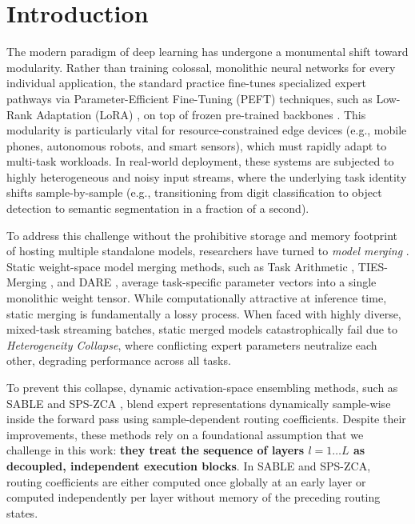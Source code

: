 \section{Introduction}
\label{sec:intro}

The modern paradigm of deep learning has undergone a monumental shift toward modularity. Rather than training colossal, monolithic neural networks for every individual application, the standard practice fine-tunes specialized expert pathways via Parameter-Efficient Fine-Tuning (PEFT) techniques, such as Low-Rank Adaptation (LoRA) \cite{hu21lora}, on top of frozen pre-trained backbones \cite{dosovitskiy20vit, devlin18bert}. This modularity is particularly vital for resource-constrained edge devices (e.g., mobile phones, autonomous robots, and smart sensors), which must rapidly adapt to multi-task workloads. In real-world deployment, these systems are subjected to highly heterogeneous and noisy input streams, where the underlying task identity shifts sample-by-sample (e.g., transitioning from digit classification to object detection to semantic segmentation in a fraction of a second).

To address this challenge without the prohibitive storage and memory footprint of hosting multiple standalone models, researchers have turned to \emph{model merging} \cite{wortsman22soups}. Static weight-space model merging methods, such as Task Arithmetic \cite{ilharco22taskarithmetic}, TIES-Merging \cite{yadav23ties}, and DARE \cite{yu23dare}, average task-specific parameter vectors into a single monolithic weight tensor. While computationally attractive at inference time, static merging is fundamentally a lossy process. When faced with highly diverse, mixed-task streaming batches, static merged models catastrophically fail due to \emph{Heterogeneity Collapse}, where conflicting expert parameters neutralize each other, degrading performance across all tasks.

To prevent this collapse, dynamic activation-space ensembling methods, such as SABLE \cite{liang23sable} and SPS-ZCA \cite{zhang24spszca}, blend expert representations dynamically sample-wise inside the forward pass using sample-dependent routing coefficients. Despite their improvements, these methods rely on a foundational assumption that we challenge in this work: \textbf{they treat the sequence of layers $l = 1 \dots L$ as decoupled, independent execution blocks}. In SABLE and SPS-ZCA, routing coefficients are either computed once globally at an early layer or computed independently per layer without memory of the preceding routing states. 

